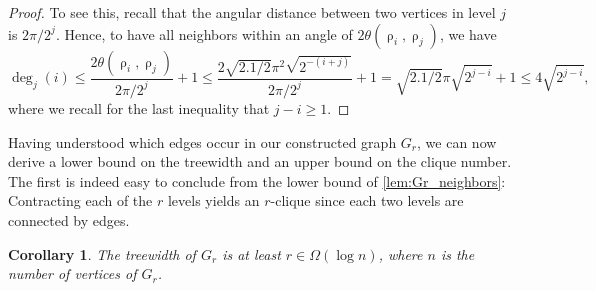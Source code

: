 \documentclass[11pt]{article}
\newtheorem{theorem}{Theorem}
\newtheorem{corollary}[theorem]{Corollary}
\providecommand{\todo}[2][]{}
\DeclareMathOperator{\rad}{\rho}
\begin{document}
\begin{proof}
    To see this, recall that the angular distance between two vertices in level $ j $ is $ 2 \pi / 2^j $.
    Hence, to have all neighbors within an angle of $ 2 \theta(\rad_i,\rad_j) $, we have
    \begin{equation*}
        \deg_j(i) 
        \leq \frac{2 \theta(\rad_i,\rad_j)}{2 \pi / 2^j} + 1
        \leq \frac{2 \sqrt{2.1/2} \pi^2 \sqrt{2^{-(i+j)}}}{2\pi/2^j} + 1
        = \sqrt{2.1/2} \pi \sqrt{2^{j-i}} + 1
        \leq 4 \sqrt{2^{j-i}},
    \end{equation*}
    where we recall for the last inequality that $ j - i \geq 1 $.
\end{proof}
%
Having understood which edges occur in our constructed graph $ G_r $, we can now derive a lower bound on the treewidth and an upper bound on the clique number.
The first is indeed easy to conclude from the lower bound of \cref{lem:Gr_neighbors}: 
Contracting each of the $ r $ levels yields an $ r $-clique since each two levels are connected by edges.
%
\begin{corollary}\label{cor:Gr_tw_logn}
    The treewidth of $ G_r $ is at least $ r \in \Omega(\log n) $, where $ n $ is the number of vertices of $ G_r $.
\end{corollary}
%
%
%
%
\todo[inline]{We have a proof sketch that $ G_r $ is far from having product structure in the sense that there are many vertices having large treewidth in their neighborhood. But we may as well just leave it out. In case we include it, we might bring back the discussion at the end \cref{sec:lower_bound_tw_loglogn}}
%
%
%
%
% 
% 
\end{document}
